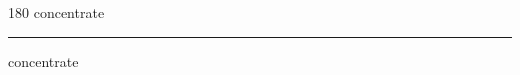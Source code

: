
\begin{frame}
\begin{center}
\begin{turn}{180}
{\fontsize{2.5cm}{1em}\selectfont concentrate}
\end{turn}
\vspace{1em}\par  
\hrule
\vspace{1em}\par  
{\fontsize{2.5cm}{1em}\selectfont concentrate}
\end{center}
\end{frame}
